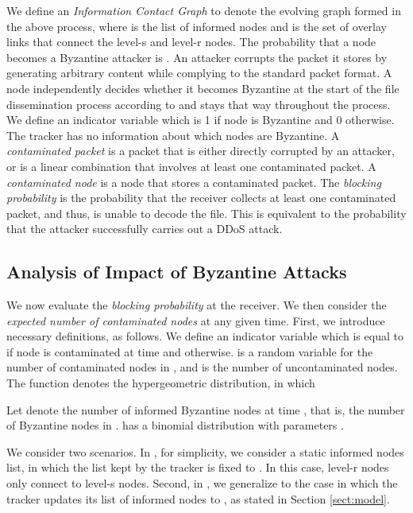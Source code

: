 We define an \emph{Information Contact Graph}  to denote the evolving graph formed in the above process, where  is the list of informed nodes and  is the set of overlay links that connect the level-s and level-r nodes.
The probability that a node becomes a Byzantine attacker is . An attacker corrupts the packet it stores by generating arbitrary content while complying to the standard packet format. A node independently decides whether it becomes Byzantine at the start of the file dissemination process according to  and stays that way throughout the process. We define an indicator variable  which is 1 if node  is Byzantine and 0 otherwise. The tracker has no information about which nodes are Byzantine. A \emph{contaminated packet} is a packet that is either directly corrupted by an attacker, or is a linear combination that involves at least one contaminated packet. A \emph{contaminated node} is a node that stores a contaminated packet. The \emph{blocking probability}  is the probability that the receiver collects at least one contaminated packet, and thus, is unable to decode the file. This is equivalent to the probability that the attacker successfully carries out a DDoS attack.

\subsection{Analysis of Impact of Byzantine Attacks}

 We now evaluate the {\em blocking probability} at the receiver. We then consider the {\em expected number of contaminated nodes} at any given time. First, we introduce necessary definitions, as follows.
 We define an indicator variable  which is equal to  if node  is contaminated at time  and  otherwise.
  is a random variable for the number of contaminated nodes in , and  is the number of uncontaminated nodes. The function  denotes the hypergeometric distribution, in which
 
 Let  denote the number of informed Byzantine nodes at time , that is, the number of Byzantine nodes in .  has a binomial distribution with parameters .


We consider two scenarios. In , for simplicity, we consider a static informed nodes list, in which the list kept by the tracker is fixed to . In this case, level-r nodes only connect to level-s nodes. Second, in , we generalize to the case in which the tracker updates its list of informed nodes to , as stated in Section \ref{sect:model}.


